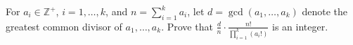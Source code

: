 For $ a_i \in \mathbb{Z}^ \plus{}$, $ i = 1, \ldots, k$, and $ n = \sum^k_{i = 1} a_i$, let $ d = \gcd(a_1, \ldots, a_k)$ denote the greatest common divisor of $ a_1, \ldots, a_k$. Prove that $ \frac {d} {n} \cdot \frac {n!}{\prod\limits^k_{i = 1} (a_i!)}$ is an integer.
